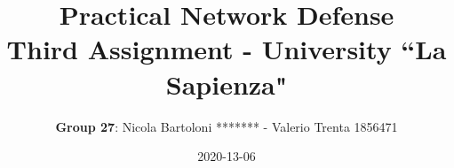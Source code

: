 \documentclass[letterpaper,11pt]{article}
\begin{document}
\title{\textbf{Practical Network Defense}\\ \bigskip \large Third Assignment - University ``La Sapienza"}
\date{2020-13-06}
\author{\textbf{Group 27}: Nicola Bartoloni ******* - Valerio Trenta 1856471}
\maketitle


\newpage

\newpage

\newpage

\newpage

\newpage

\newpage
\end{document}
